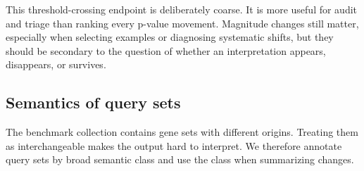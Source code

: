 \documentclass[11pt]{article}
\begin{document}
This threshold-crossing endpoint is deliberately coarse. It is more useful for audit and triage than ranking every p-value movement. Magnitude changes still matter, especially when selecting examples or diagnosing systematic shifts, but they should be secondary to the question of whether an interpretation appears, disappears, or survives.

\subsection{Semantics of query sets}

The benchmark collection contains gene sets with different origins. Treating them as interchangeable makes the output hard to interpret. We therefore annotate query sets by broad semantic class and use the class when summarizing changes.
\end{document}
